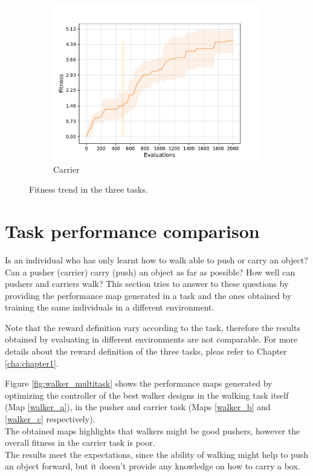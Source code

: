 \begin{figure}
\begin{subfigure}[b]{0.3\textwidth}
        \includegraphics[scale=0.35]{images/multitasking/ft_carrier.pdf}
        \caption{Carrier}
    \end{subfigure}
    \caption{Fitness trend in the three tasks.}
    \label{fig:task_comparison}
\end{figure}


\section{Task performance comparison}
Is an individual who has only learnt how to walk able to push or carry an object? Can a pusher (carrier) carry (push) an object as far as possible? How well can pushers and carriers walk?
This section tries to answer to these questions by providing the performance map generated in a task and the ones obtained by training the same individuals in a different environment.

Note that the reward definition vary according to the task, therefore the results obtained by evaluating in different environments are not comparable.
For more details about the reward definition of the three tasks, pleas refer to Chapter \ref{cha:chapter1}.

Figure \ref{fig:walker_multitask} shows the performance maps generated by optimizing the controller of the best walker designs in the walking task itself (Map \ref{walker_a}), in the pusher and carrier task (Maps \ref{walker_b} and \ref{walker_c} respectively).\\
The obtained maps highlights that walkers might be good pushers, however the overall fitness in the carrier task is poor.\\
The results meet the expectations, since the ability of walking might help to push an object forward, but it doesn't provide any knowledge on how to carry a box.

